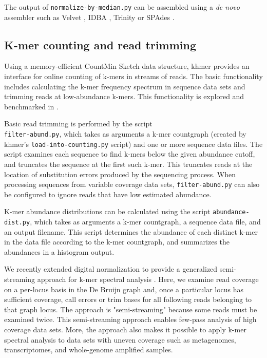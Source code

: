 \documentclass[10pt,a4paper]{article}
\begin{document}
The output of {\tt normalize-by-median.py} can be assembled using a {\em de novo} assembler such as Velvet \cite{Zerbino2008}, IDBA \cite{peng2010idba}, Trinity \cite{Haas2013} or SPAdes \cite{bankevich2012spades}.

\subsection*{K-mer counting and read trimming}

Using a memory-efficient CountMin Sketch data structure, khmer provides an
interface for online counting of k-mers in streams of reads.  The
basic functionality includes calculating the k-mer frequency spectrum
in sequence data sets and trimming reads at low-abundance k-mers.
This functionality is explored and benchmarked in \cite{zhang2014}.

Basic read trimming is performed by the script\\
{\tt filter-abund.py}, which takes as arguments
a k-mer countgraph (created by khmer's {\tt load-into-counting.py} script) and one or more
sequence data files.  The script examines each sequence to find k-mers below the given abundance cutoff,
and truncates the sequence at the first such k-mer.  This truncates reads at the location of 
substitution errors produced by the sequencing process.  When processing sequences from variable
coverage data sets, {\tt filter-abund.py} can also be configured
to ignore reads that have low estimated abundance.

K-mer abundance distributions can be calculated using the script {\tt abundance-dist.py}, which takes
as arguments a k-mer countgraph, a sequence data file, and an output filename.  This script determines
the abundance of each distinct k-mer in the data file according to the k-mer countgraph, and summarizes
the abundances in a histogram output.

We recently extended digital normalization to provide a generalized semi-streaming approach for k-mer spectral analysis \cite{zhang2015crossing}. Here, we examine read coverage on a per-locus basis in the De Bruijn graph and, once a particular locus has sufficient coverage, call errors or trim bases for all following reads belonging to that graph locus.  The approach is "semi-streaming" \cite{zhang2015crossing} because some reads must be examined twice.  This semi-streaming approach enables few-pass analysis of high coverage data sets. More, the approach also makes it possible to apply k-mer spectral analysis to data sets with uneven coverage such as metagenomes, transcriptomes, and whole-genome amplified samples.
\end{document}

